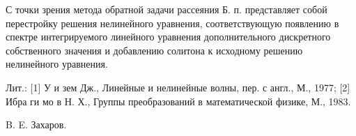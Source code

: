 \documentclass[10pt]{article}
\begin{document}
С точки зрения метода обратной задачи рассеяния Б. п. представляет собой перестройку решения нелинейного уравнения, соответствующую появлению в спектре интегрируемого линейного уравнения дополнительного дискретного собственного значения и добавлению солитона к исходному решению нелинейного уравнения.



Лит.: [1] У и зем Дж., Линейные и нелинейные волны, пер. с англ., М., 1977; [2] Ибра ги мо в Н. Х., Группы преобразований в математической физике, М., 1983.



B. E. Захаров.
\end{document}
